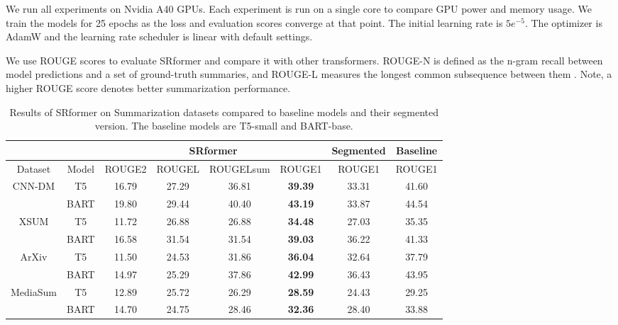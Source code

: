 \documentclass[11pt]{article}
\begin{document}
We run all experiments on Nvidia A40 GPUs. Each experiment is run on a single core to compare GPU power and memory usage. We train the models for 25 epochs as the loss and evaluation scores converge at that point. The initial learning rate is $5e^{-5}$. The optimizer is AdamW and the learning rate scheduler is linear with default settings.

We use ROUGE scores to evaluate SRformer and compare it with other transformers. ROUGE-N is defined as the n-gram recall between model predictions and a set of ground-truth summaries, and ROUGE-L measures the longest common subsequence between them \citep{lin-2004-rouge}. Note, a higher ROUGE score denotes better summarization performance.

\begin{table*}[htbp]
    \centering
    \begin{tabular}{c|c|c|c|c|c|c|c}
       \hline
      & & \multicolumn{4}{c|}{\textbf{SRformer}} & \textbf{Segmented} & \textbf{Baseline}\\
       \hline
        Dataset & Model &    ROUGE2 &  ROUGEL &  ROUGELsum  & ROUGE1 & ROUGE1 & ROUGE1\\
       \hline
       \multirow{2}{*}{CNN-DM} & T5  & 16.79 & 27.29 & 36.81 &  \textbf{39.39} & 33.31  & 41.60\\
        & BART  & 19.80 & 29.44 & 40.40 &  \textbf{43.19} & 33.87 & 44.54\\
        \multirow{2}{*}{XSUM} & T5&   11.72 & 26.88 &  26.88 & \textbf{34.48} & 27.03 & 35.35\\
        & BART&   16.58 & 31.54&  31.54 & \textbf{39.03} & 36.22 & 41.33\\
        \multirow{2}{*}{ ArXiv} & T5&   11.50 & 24.53& 31.86 & \textbf{36.04} & 32.64 & 37.79 \\
        & BART & 14.97 & 25.29 & 37.86 & \textbf{42.99}& 36.43 & 43.95\\
        \multirow{2}{*}{MediaSum} & T5&   12.89 & 25.72 &  26.29& \textbf{28.59} &24.43& 29.25 \\
        & BART& 14.70   & 24.75 & 28.46 & \textbf{32.36} & 28.40 & 33.88 \\
       \hline
    \end{tabular}
    \caption{Results of SRformer on Summarization datasets compared to baseline models and their segmented version. The baseline models are T5-small and BART-base. }
    \label{tab:sum}
\end{table*}
\end{document}
